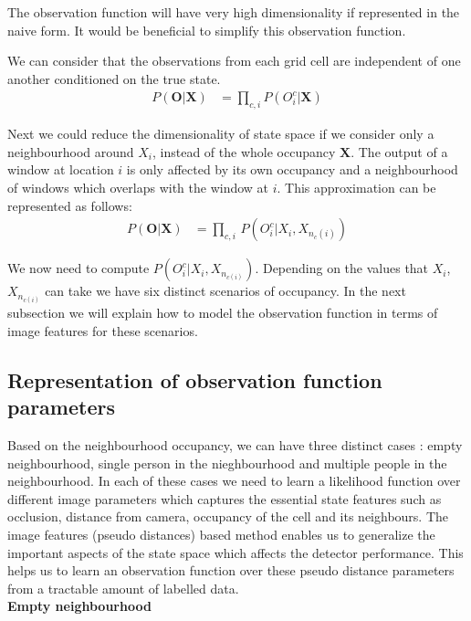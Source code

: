 \documentclass[10pt,twocolumn,letterpaper]{article}
\newcommand{\obs}{\mathbf{O}}
\newcommand{\state}{\mathbf{X}}
\begin{document}
The observation function will have very high dimensionality if represented in the naive form. It would be beneficial to simplify this observation function.

We can consider that the observations from each grid cell are independent of one another conditioned on the true state.
\begin{align}
P(\textbf{O}|\textbf{X})&=\prod_{c,i} {P(O_{i}^{c}|\textbf{X})}
\end{align}

Next we could reduce the dimensionality of state space if we consider only a neighbourhood around $ X_{i} $, instead of the whole occupancy $\textbf{X} $. The output of a window at location $ i $ is only affected by its own occupancy and a neighbourhood of windows which overlaps with the window at $ i$. This approximation can be represented as follows:\\ 

\begin{align}
  P(\obs|\state) &= \prod_{c,i} \, P(O_{i}^{c}|X_{i},X_{n_{c}(i)})
\end{align}

We now need to compute  $ P(O_{i}^{c}|X_{i},X_{n_{c(i)}}) $. Depending on the values that $ X_{i} $, $ X_{n_{c(i)}} $ can take we have six distinct scenarios of occupancy. In the next subsection we will explain how to model the observation function in terms of image features for these scenarios.    \\

\subsection{Representation of observation function parameters}

Based on the neighbourhood occupancy, we can have three distinct cases : empty neighbourhood, single person in the nieghbourhood and multiple people in the neighbourhood. In each of these cases we need to learn a likelihood function over different image parameters which captures the essential state features such as occlusion, distance from camera, occupancy of the cell and its neighbours. The image features (pseudo distances) based method enables us to generalize the important aspects of the state space which affects the detector performance. This helps us to learn an observation function over these pseudo distance parameters from a tractable amount of labelled data.\\

\textbf{Empty neighbourhood}
\end{document}
